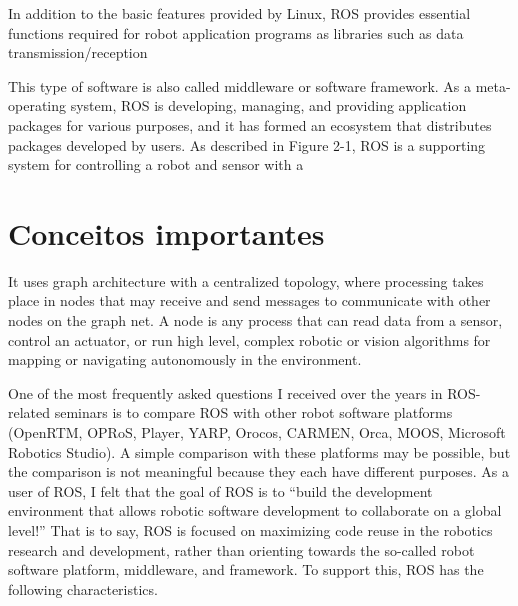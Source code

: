 In addition to the basic features provided by Linux, ROS provides essential functions required for robot application programs as libraries such as data transmission/reception 


This type of software is also called middleware or software framework. As a meta-operating system, ROS is developing, managing, and providing application packages for various purposes, and it has formed an ecosystem that distributes packages developed by users. 
As described in Figure 2-1, ROS is a supporting system for controlling a robot and sensor with a 


\section{Conceitos importantes}

It uses graph architecture with a centralized topology, where processing takes place in nodes that may receive and send messages to communicate with other nodes on the graph net. A node is any process that can read data from a sensor, control an actuator, or run high level, complex robotic or vision algorithms for mapping or navigating autonomously in the
environment.\cite{rosEfetiveProgram}

One of the most frequently asked questions I received over the years in ROS-related seminars is to compare ROS with other robot software platforms (OpenRTM, OPRoS, Player, YARP, Orocos, CARMEN, Orca, MOOS, Microsoft Robotics Studio). A simple comparison with these platforms may be possible, but the comparison is not meaningful because they each have different purposes. As a user of ROS, I felt that the goal of ROS is to “build the development environment that allows robotic software development to collaborate on a global level!” That is to say, ROS is focused on maximizing code reuse in the robotics research and development, rather than orienting towards the so-called robot software platform, middleware, and framework. To support this, ROS has the following characteristics.


